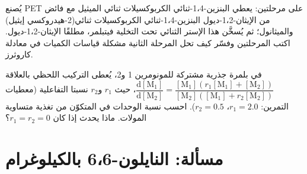\begin{exercise}[$\star\star\star$]\label{exo:b2:polymer-synthesis:11}
يُصنع PET على مرحلتين: يعطي البنزين-1،4-ثنائي الكربوكسيلات ثنائي الميثيل مع فائض من الإيثان-1،2-ديول
البنزين-1،4-ثنائي الكربوكسيلات ثنائي(2-هيدروكسي إيثيل) والميثانول؛ ثم يُسخَّن هذا الإستر الثنائي تحت التخلية
فيتبلمر، مطلقًا الإيثان-1،2-ديول. اكتب المرحلتين وفسّر كيف تحل المرحلة الثانية
مشكلة قياسات الكميات في معادلة كاروثرز.
\end{exercise}

\begin{exercise}[$\star\star\star$]\label{exo:b2:polymer-synthesis:12}
في بلمرة جذرية مشتركة للمونومرين 1 و2، يُعطى التركيب اللحظي 
بالعلاقة $\dfrac{\mathrm d[\mathrm M_1]}{\mathrm d[\mathrm M_2]} = \dfrac{[\mathrm M_1](r_1[\mathrm M_1]
+ [\mathrm M_2])}{[\mathrm M_2]([\mathrm M_1] + r_2[\mathrm M_2])}$، حيث $r_1$ و$r_2$
نسبتا التفاعلية (معطيات التمرين: $r_1 = 2.0$، $r_2 = 0.5$). احسب نسبة الوحدات في
 المتكوّن من تغذية متساوية المولات. ماذا يحدث إذا كان $r_1 = r_2 = 0$؟
\end{exercise}

\section{مسألة: النايلون-6،6 بالكيلوغرام}

